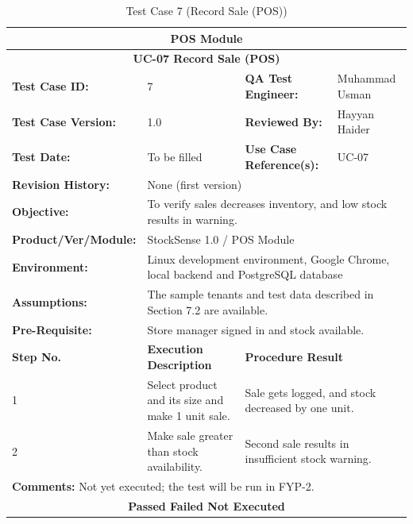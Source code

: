 \documentclass{StockSense}
\begin{document}
\begin{table}[!htbp]
\centering
\caption{Test Case 7 (Record Sale (POS))}
{\small\linespread{1}\selectfont\renewcommand{\arraystretch}{1.25}
\begin{tabular}{|p{}|p{}|p{}|p{}|}
\hline
\multicolumn{4}{|c|}{\textbf{POS Module}} \\ \hline
\multicolumn{4}{|c|}{\textbf{UC-07 Record Sale (POS)}} \\ \hline
\textbf{Test Case ID:} & 7 & \textbf{QA Test Engineer:} & Muhammad Usman \\ \hline
\textbf{Test Case Version:} & 1.0 & \textbf{Reviewed By:} & Hayyan Haider \\ \hline
\textbf{Test Date:} & To be filled & \textbf{Use Case Reference(s):} & UC-07 \\ \hline
\textbf{Revision History:} & \multicolumn{3}{p{\dimexpr0.70\textwidth+4\tabcolsep\relax}|}{None (first version)} \\ \hline
\textbf{Objective:} & \multicolumn{3}{p{\dimexpr0.70\textwidth+4\tabcolsep\relax}|}{To verify sales decreases inventory, and low stock results in warning.} \\ \hline
\textbf{Product/Ver/Module:} & \multicolumn{3}{p{\dimexpr0.70\textwidth+4\tabcolsep\relax}|}{StockSense 1.0 / POS Module} \\ \hline
\textbf{Environment:} & \multicolumn{3}{p{\dimexpr0.70\textwidth+4\tabcolsep\relax}|}{Linux development environment, Google Chrome, local backend and PostgreSQL database} \\ \hline
\textbf{Assumptions:} & \multicolumn{3}{p{\dimexpr0.70\textwidth+4\tabcolsep\relax}|}{The sample tenants and test data described in Section 7.2 are available.} \\ \hline
\textbf{Pre-Requisite:} & \multicolumn{3}{p{\dimexpr0.70\textwidth+4\tabcolsep\relax}|}{Store manager signed in and stock available.} \\ \hline
\textbf{Step No.} & \textbf{Execution Description} & \multicolumn{2}{l|}{\textbf{Procedure Result}} \\ \hline
1 & Select product and its size and make 1 unit sale. & \multicolumn{2}{p{\dimexpr0.42\textwidth+2\tabcolsep\relax}|}{Sale gets logged, and stock decreased by one unit.} \\ \hline
2 & Make sale greater than stock availability. & \multicolumn{2}{p{\dimexpr0.42\textwidth+2\tabcolsep\relax}|}{Second sale results in insufficient stock warning.} \\ \hline
\multicolumn{4}{|l|}{\textbf{Comments:} Not yet executed; the test will be run in FYP-2.} \\ \hline
\multicolumn{4}{|c|}{\textbf{Passed \quad Failed \quad Not Executed}} \\ \hline
\end{tabular}\par}
\end{table}
\end{document}
